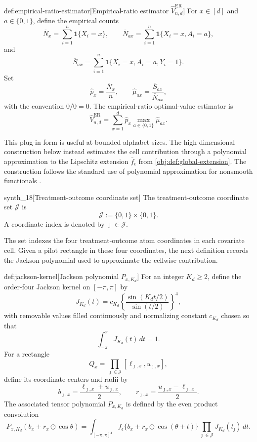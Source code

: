 \documentclass[11pt]{article}
\begin{document}
\begin{definitionv}{def:empirical-ratio-estimator}[Empirical-ratio estimator \(\widehat V_{n,d}^{\mathrm{ER}}\)]
For \(x\in[d]\) and \(a\in\{0,1\}\), define the empirical counts
\[
\overline N_x
=
\sum_{i=1}^n \mathbf 1\{X_i=x\},
\qquad
\overline N_{ax}
=
\sum_{i=1}^n \mathbf 1\{X_i=x,A_i=a\},
\]
and
\[
\overline S_{ax}
=
\sum_{i=1}^n \mathbf 1\{X_i=x,A_i=a,Y_i=1\}.
\]
Set
\[
\widehat p_x=\frac{\overline N_x}{n},
\qquad
\widehat\mu_{ax}=\frac{\overline S_{ax}}{\overline N_{ax}},
\]
with the convention \(0/0=0\). The empirical-ratio optimal-value estimator is
\[
\widehat V_{n,d}^{\mathrm{ER}}
=
\sum_{x=1}^d \widehat p_x \max_{a\in\{0,1\}}\widehat\mu_{ax}.
\]
\end{definitionv}

This plug-in form is useful at bounded alphabet sizes. The high-dimensional construction below instead estimates the cell contribution through a polynomial approximation to the Lipschitz extension \(\bar f_\epsilon\) from \cref{obj:def:global-extension}. The construction follows the standard use of polynomial approximation for nonsmooth functionals \citep{DeVore1993,JiaoVenkatHanWeissman2015Functionals}.

\begin{definitionv}{synth_18}[Treatment-outcome coordinate set]
The treatment-outcome coordinate set \(\mathcal J\) is
\[
\mathcal J:=\{0,1\}\times\{0,1\}.
\]
A coordinate index is denoted by \(\jmath\in\mathcal J\).
\end{definitionv}

The set  indexes the four treatment-outcome atom coordinates in each covariate cell. Given a pilot rectangle in these four coordinates, the next definition records the Jackson polynomial used to approximate the cellwise contribution.

\begin{definitionv}{def:jackson-kernel}[Jackson polynomial \(P_{x,K_d}\)]
For an integer \(K_d\ge 2\), define the order-four Jackson kernel on \([-\pi,\pi]\) by
\[
J_{K_d}(t)
=
c_{K_d}
\left\{
\frac{\sin(K_dt/2)}{\sin(t/2)}
\right\}^{4},
\]
with removable values filled continuously and normalizing constant \(c_{K_d}\) chosen so that
\[
\int_{-\pi}^{\pi} J_{K_d}(t)\,dt=1.
\]
For a rectangle
\[
Q_x
=
\prod_{\jmath\in\mathcal J}
[\ell_{\jmath,x},u_{\jmath,x}],
\]
define its coordinate centers and radii by
\[
b_{\jmath,x}
=
\frac{\ell_{\jmath,x}+u_{\jmath,x}}{2},
\qquad
r_{\jmath,x}
=
\frac{u_{\jmath,x}-\ell_{\jmath,x}}{2}.
\]
The associated tensor polynomial \(P_{x,K_d}\) is defined by the even product convolution
\[
P_{x,K_d}(b_x+r_x\odot\cos\theta)
=
\int_{[-\pi,\pi]^4}
\bar f_\epsilon\{b_x+r_x\odot\cos(\theta+t)\}
\prod_{\jmath\in\mathcal J}J_{K_d}(t_{\jmath})\,dt.
\]
\end{definitionv}
\end{document}
